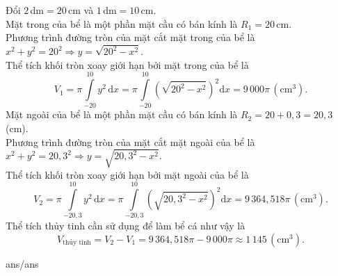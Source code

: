 \begin{ex}
{\begin{center}
		\end{center}
		Đổi $2$\,dm$=20$\,cm và $1$\,dm$=10$\,cm.\\
		Mặt trong của bể là một phần mặt cầu có bán kính là $R_1 = 20$\,cm.\\
		Phương trình đường tròn của mặt cắt mặt trong của bể là $x^2 + y^2 = 20^2 \Rightarrow y = \sqrt{20^2 - x^2}$.\\
		Thể tích khối tròn xoay giới hạn bởi mặt trong của bể là
		\[V_1 = \pi\displaystyle\int\limits_{-20}^{10} y^2 \mathrm{\,d}x
		= \pi\int\limits_{-20}^{10} \left(\sqrt{20^2-x^2}\right)^2\mathrm{d}x
		= 9\,000\pi\, \left(\text{cm}^3\right).\]
		Mặt ngoài của bể là một phần mặt cầu có bán kính là $R_2 = 20 + 0{,}3 = 20{,}3$ (cm).
		\\
		Phương trình đường tròn của mặt cắt mặt ngoài của bể là $x^2 + y^2 = 20{,}3^2 \Rightarrow y = \sqrt{20{,}3^2 - x^2}$.
		\\
		Thể tích khối tròn xoay giới hạn bởi mặt ngoài của bể là
		\[V_2=\pi\displaystyle\int\limits_{-20{,}3}^{10} y^2\mathrm{\,d}x=\pi\int\limits_{-20{,}3}^{10} \left(\sqrt{20{,}3^2-x^2}\right)^2\mathrm{d}x=9\,364{,}518\pi\, \left(\text{cm}^3\right).\]
		Thể tích thủy tinh cần sử dụng để làm bể cá như vậy là \[V_{\text{thủy tinh}} = V_2 - V_1 = 9\,364{,}518\pi - 9\,000\pi \approx 1\,145\, \left(\text{cm}^3\right).\]
	}
\end{ex}

\begin{indapan}
	{ans/ans\currfilebase}
\end{indapan}